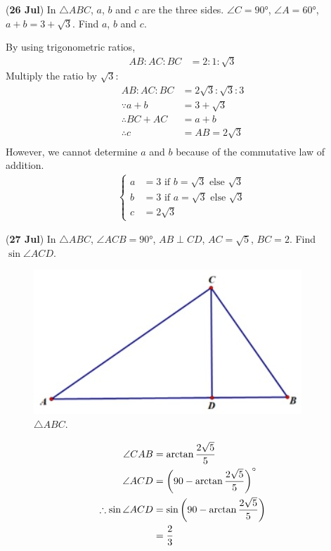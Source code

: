 \documentclass[12pt,answers]{exam}
\renewcommand{\frac}[2]{\dfrac{#1}{#2}}
\newcommand{\qndate}[2]{(\textbf{#1 #2})}
\begin{document}
\begin{questions}
  \question \qndate{26}{Jul} In $\triangle ABC$, $a$, $b$ and $c$ are
  the three sides.
  $\angle C = \ang{90}$, $\angle A = \ang{60}$, $a + b = 3 +
  \sqrt{3}$. Find $a$, $b$
  and $c$.
  \begin{solution}
    By using trigonometric ratios,
    \begin{align*}
      AB : AC : BC & = 2 : 1 : \sqrt{3}
    \end{align*}
    Multiply the ratio by $\sqrt{3}$:
    \begin{align*}
      AB : AC : BC       & = 2\sqrt{3} : \sqrt{3} : 3 \\
      \because a + b     & = 3 + \sqrt{3}             \\
      \therefore BC + AC & = a + b                    \\
      \therefore c       & = AB = 2\sqrt{3}           \\
    \end{align*}
    However, we cannot determine $a$ and $b$ because of the
    commutative law of addition.
    \begin{align*}
      \begin{cases}
        a & = 3 \text{ if } b = \sqrt{3} \text{ else } \sqrt{3} \\
        b & = 3 \text{ if } a = \sqrt{3} \text{ else } \sqrt{3} \\
        c & = 2\sqrt{3}
      \end{cases}
    \end{align*}
  \end{solution}

  \question \qndate{27}{Jul} In $\triangle ABC$, $\angle ACB =
  \ang{90}$, $AB \perp CD$,
  $AC = \sqrt{5}$, $BC = 2$. Find $\sin\angle ACD$.
  \begin{figure}[htpb]
    \centering
    \includegraphics[scale=.5]{images/0727_Tri.jpeg}
    \caption{$\triangle ABC$.}
    \label{fig:0727_Tri}
  \end{figure}
  \begin{solution}
    \begin{align*}
      \angle CAB                & = \arctan \frac{2\sqrt{5}}{5}
      \\
      \angle ACD                & = \left(90-\arctan
      \frac{2\sqrt{5}}{5}\right) \degree \\
      \therefore \sin\angle ACD & = \sin \left(90-\arctan
      \frac{2\sqrt{5}}{5}\right)    \\
      & = \frac{2}{3}
    \end{align*}
  \end{solution}


\end{questions}
\end{document}
